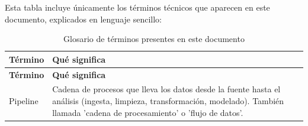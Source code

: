 Esta tabla incluye únicamente los términos técnicos que aparecen en este
documento, explicados en lenguaje sencillo:

\begingroup
\small
\setlength{\tabcolsep}{3pt}
\begin{longtable}{>{\raggedright\arraybackslash}p{4.3cm}>{\raggedright\arraybackslash}p{9.8cm}}
\caption{Glosario de términos presentes en este documento}
\label{tab:glosario}\\
\toprule
\textbf{Término} & \textbf{Qué significa} \\
\midrule
\endfirsthead
\toprule
\textbf{Término} & \textbf{Qué significa} \\
\midrule
\endhead
    Pipeline & Cadena de procesos que lleva los datos desde la fuente hasta el análisis (ingesta, limpieza, transformación, modelado). También llamada 'cadena de procesamiento' o 'flujo de datos'.
 \\
\bottomrule
\end{longtable}
\endgroup
